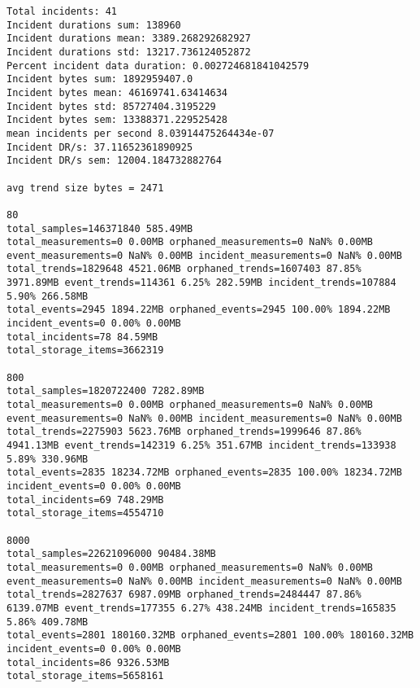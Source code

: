 \begin{lstlisting}
Total incidents: 41
Incident durations sum: 138960
Incident durations mean: 3389.268292682927
Incident durations std: 13217.736124052872
Percent incident data duration: 0.002724681841042579
Incident bytes sum: 1892959407.0
Incident bytes mean: 46169741.63414634
Incident bytes std: 85727404.3195229
Incident bytes sem: 13388371.229525428
mean incidents per second 8.03914475264434e-07
Incident DR/s: 37.11652361890925
Incident DR/s sem: 12004.184732882764

avg trend size bytes = 2471

80
total_samples=146371840 585.49MB
total_measurements=0 0.00MB orphaned_measurements=0 NaN% 0.00MB event_measurements=0 NaN% 0.00MB incident_measurements=0 NaN% 0.00MB
total_trends=1829648 4521.06MB orphaned_trends=1607403 87.85% 3971.89MB event_trends=114361 6.25% 282.59MB incident_trends=107884 5.90% 266.58MB
total_events=2945 1894.22MB orphaned_events=2945 100.00% 1894.22MB incident_events=0 0.00% 0.00MB
total_incidents=78 84.59MB
total_storage_items=3662319

800
total_samples=1820722400 7282.89MB
total_measurements=0 0.00MB orphaned_measurements=0 NaN% 0.00MB event_measurements=0 NaN% 0.00MB incident_measurements=0 NaN% 0.00MB
total_trends=2275903 5623.76MB orphaned_trends=1999646 87.86% 4941.13MB event_trends=142319 6.25% 351.67MB incident_trends=133938 5.89% 330.96MB
total_events=2835 18234.72MB orphaned_events=2835 100.00% 18234.72MB incident_events=0 0.00% 0.00MB
total_incidents=69 748.29MB
total_storage_items=4554710

8000
total_samples=22621096000 90484.38MB
total_measurements=0 0.00MB orphaned_measurements=0 NaN% 0.00MB event_measurements=0 NaN% 0.00MB incident_measurements=0 NaN% 0.00MB
total_trends=2827637 6987.09MB orphaned_trends=2484447 87.86% 6139.07MB event_trends=177355 6.27% 438.24MB incident_trends=165835 5.86% 409.78MB
total_events=2801 180160.32MB orphaned_events=2801 100.00% 180160.32MB incident_events=0 0.00% 0.00MB
total_incidents=86 9326.53MB
total_storage_items=5658161

\end{lstlisting}
